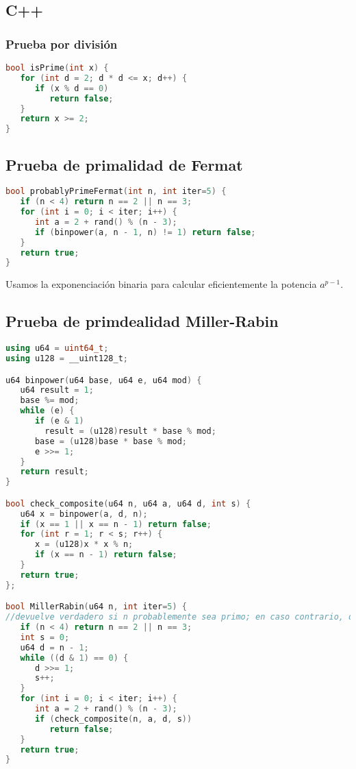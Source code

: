 \subsection{C++}

\subsubsection{Prueba por división}
\begin{lstlisting}[language=C++]
bool isPrime(int x) {
   for (int d = 2; d * d <= x; d++) {
      if (x % d == 0)
         return false;
   }
   return x >= 2;
}
\end{lstlisting} 

\subsection{Prueba de primalidad de Fermat}
\begin{lstlisting}[language=C++]
bool probablyPrimeFermat(int n, int iter=5) {
   if (n < 4) return n == 2 || n == 3;
   for (int i = 0; i < iter; i++) {
      int a = 2 + rand() % (n - 3);
      if (binpower(a, n - 1, n) != 1) return false;
   }
   return true;
}
\end{lstlisting} 

Usamos la exponenciación binaria para calcular eficientemente la potencia $a^{p-1}$.

\subsection{Prueba de primdealidad  Miller-Rabin}
\begin{lstlisting}[language=C++]
using u64 = uint64_t;
using u128 = __uint128_t;

u64 binpower(u64 base, u64 e, u64 mod) {
   u64 result = 1;
   base %= mod;
   while (e) {
      if (e & 1)
        result = (u128)result * base % mod;
      base = (u128)base * base % mod;
      e >>= 1;
   }
   return result;
}

bool check_composite(u64 n, u64 a, u64 d, int s) {
   u64 x = binpower(a, d, n);
   if (x == 1 || x == n - 1) return false;
   for (int r = 1; r < s; r++) {
      x = (u128)x * x % n;
      if (x == n - 1) return false;
   }
   return true;
};

bool MillerRabin(u64 n, int iter=5) { 
//devuelve verdadero si n probablemente sea primo; en caso contrario, devuelve falso.
   if (n < 4) return n == 2 || n == 3;
   int s = 0;
   u64 d = n - 1;
   while ((d & 1) == 0) {
      d >>= 1;
      s++;
   }
   for (int i = 0; i < iter; i++) {
      int a = 2 + rand() % (n - 3);
      if (check_composite(n, a, d, s))
         return false;
   }
   return true;
}
\end{lstlisting} 

